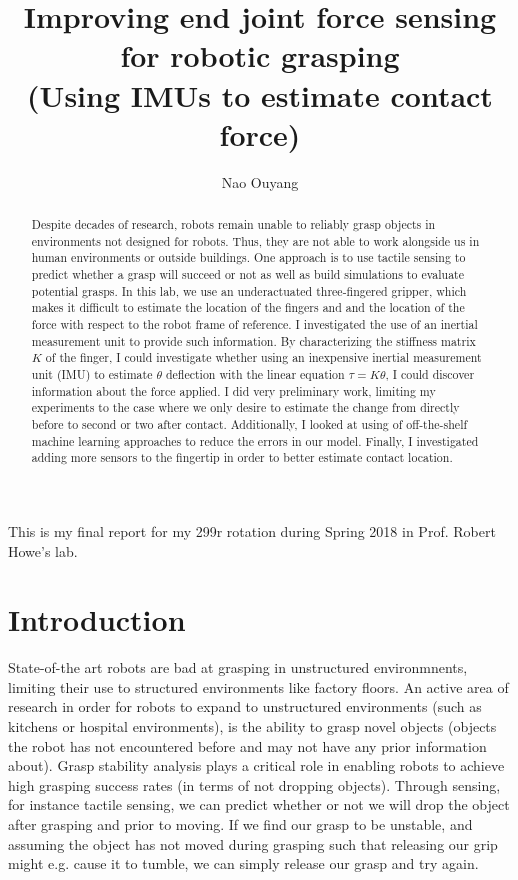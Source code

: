 \documentclass[12pt]{article}
\title{Improving end joint force sensing for robotic grasping\\
(Using IMUs to estimate contact force)}
\author{Nao Ouyang}
\begin{document}
 

\maketitle

\begin{introduction}
    This is my final report for my 299r rotation during Spring 2018 in Prof. Robert Howe's lab.
\end{introduction}
\begin{abstract} 
    Despite decades of research, robots remain unable to reliably grasp objects in environments not
    designed for robots. Thus, they are not able to work alongside us in human environments or
    outside buildings. One approach is to use tactile sensing to predict whether a
    grasp will succeed or not as well as build simulations to evaluate potential grasps.
    In this lab, we use an underactuated three-fingered gripper, which makes it difficult to
    estimate the location of the fingers and and the location of the force with respect to the robot
    frame of reference.  
    I investigated the use of an inertial measurement unit to provide such information. By
    characterizing the stiffness matrix $K$ of the finger, I could investigate whether using an
    inexpensive inertial measurement unit (IMU) to estimate $\theta$ deflection with the linear equation
    $\tau = K \theta$, I could discover information about the force applied. I did very preliminary
    work, limiting my experiments to the case where we only desire to estimate the change from
    directly before to second or two after
    contact. Additionally, I looked at using of off-the-shelf machine learning approaches to reduce the
    errors in our model. Finally, I investigated adding more sensors to the fingertip in
    order to better estimate contact location. 
\end{abstract}

\section{Introduction}
State-of-the art robots are bad at grasping in unstructured environmnents, limiting their use to
structured environments like factory floors. An active area of research in order for robots to expand to unstructured
environments (such as kitchens or hospital environments),  is the ability to grasp
novel objects (objects the robot has not encountered before and may not have any prior information
about). Grasp stability analysis plays a critical role in enabling robots to achieve high grasping
success rates (in terms of not dropping objects). Through sensing, for instance tactile sensing, we
can predict whether or not we will drop the object after grasping and prior to moving. If we find
our grasp to be unstable, and assuming the object has not moved during grasping such that releasing
our grip might e.g. cause it to tumble, we can simply release our grasp and try again. 
\end{document}
